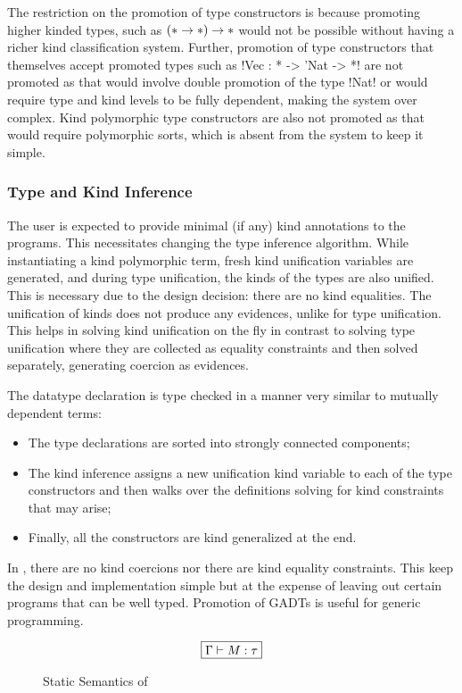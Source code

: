 \documentclass[manuscript,screen,nonacm]{acmart}
\begin{document}
The restriction on the promotion of type constructors is because promoting higher kinded types, such as $(\ast \to \ast) \to \ast$ would not be possible without having a richer kind classification system. Further, promotion of type constructors that themselves accept promoted types such as !Vec : * -> 'Nat -> *! are not promoted as that would involve double promotion of the type !Nat! or would require type and kind levels to be fully dependent, making the system over complex. Kind polymorphic type constructors are also not promoted as that would require polymorphic sorts, which is absent from the system to keep it simple.

\subsubsection{Type and Kind Inference}
The user is expected to provide minimal (if any) kind annotations to the programs. This necessitates changing the type inference algorithm. While instantiating a kind polymorphic term, fresh kind unification variables are generated, and during type unification, the kinds of the types are also unified. This is necessary due to the design decision: there are no kind equalities. The unification of kinds does not produce any evidences, unlike for type unification. This helps in solving kind unification on the fly in contrast to solving type unification where they are collected as equality constraints and then solved separately, generating coercion as evidences.

The datatype declaration is type checked in a manner very similar to mutually dependent terms:
\begin{itemize}
\item The type declarations are sorted into strongly connected components;
\item The kind inference assigns a new unification kind variable to each of the type constructors and then walks over the definitions solving for kind constraints that may arise;
\item Finally, all the constructors are kind generalized at the end.
\end{itemize}

In \SFP, there are no kind coercions nor there are kind equality constraints. This keep the design and implementation simple but at the expense of leaving out certain programs that can be well typed. Promotion of GADTs is useful for generic programming.

\begin{figure}[ht]
 \centering
 \begin{gather*}
 \fbox{$\Gamma \vdash M : \tau$}
 \end{gather*}
 \caption{Static Semantics of \SFP}
 \label{fig:sfp-typing}
\end{figure}
\end{document}
